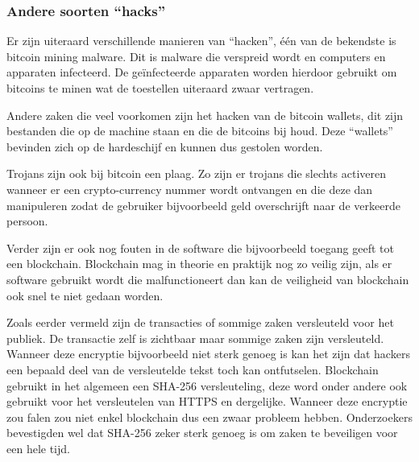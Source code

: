 \subsubsection{Andere soorten ``hacks''}
Er zijn uiteraard verschillende manieren van ``hacken'', één van de bekendste is bitcoin mining malware. Dit is malware die verspreid wordt en computers en apparaten infecteerd. De geïnfecteerde apparaten worden hierdoor gebruikt om bitcoins te minen wat de toestellen uiteraard zwaar vertragen. 

Andere zaken die veel voorkomen zijn het hacken van de bitcoin wallets, dit zijn bestanden die op de machine staan en die de bitcoins bij houd. Deze ``wallets'' bevinden zich op de hardeschijf en kunnen dus gestolen worden. 

Trojans zijn ook bij bitcoin een plaag. Zo zijn er trojans die slechts activeren wanneer er een crypto-currency nummer wordt ontvangen en die deze dan manipuleren zodat de gebruiker bijvoorbeeld geld overschrijft naar de verkeerde persoon. 

Verder zijn er ook nog fouten in de software die bijvoorbeeld toegang geeft tot een blockchain. Blockchain mag in theorie en praktijk nog zo veilig zijn, als er software gebruikt wordt die malfunctioneert dan kan de veiligheid van blockchain ook snel te niet gedaan worden.

Zoals eerder vermeld zijn de transacties of sommige zaken versleuteld voor het publiek. De transactie zelf is zichtbaar maar sommige zaken zijn versleuteld. Wanneer deze encryptie bijvoorbeeld niet sterk genoeg is kan het zijn dat hackers een bepaald deel van de versleutelde tekst toch kan ontfutselen. Blockchain gebruikt in het algemeen een SHA-256 versleuteling, deze word onder andere ook gebruikt voor het versleutelen van HTTPS en dergelijke. Wanneer deze encryptie zou falen zou niet enkel blockchain dus een zwaar probleem hebben. Onderzoekers bevestigden wel dat SHA-256 zeker sterk genoeg is om zaken te beveiligen voor een hele tijd.

